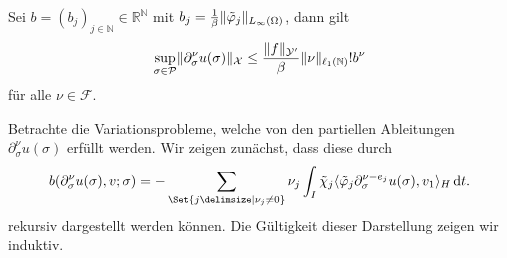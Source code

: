 \begin{Satz}
\label{satz:mhoo}
    Sei $b = (b_j)_{j \in \mathbb{N}} \in \mathbb{R}^{\mathbb{N}}$ mit $b_{j} = \frac{1}{\beta} \lVert\tilde{\varphi}_{j}\rVert_{L_{\infty}(\Omega)}$, dann gilt
    \begin{equation}
        \sup_{\sigma \in \mathcal P} \lVert\partial^{\nu}_{\sigma} u(\sigma)\rVert_{\mathcal X} \leq \frac{\lVert f\rVert_{\mathcal Y'}}{\beta} \lVert\nu\rVert_{\ell_{1}(\mathbb{N})}! b^{\nu}
    \end{equation}
    für alle $\nu \in \mathcal F$.

    \begin{Beweis}
        Betrachte die Variationsprobleme, welche von den partiellen Ableitungen $\partial^{\nu}_{\sigma} u(\sigma)$ erfüllt werden.
        Wir zeigen zunächst, dass diese durch
        \begin{equation}
        \label{eq:ps:rg:partielle_ableitungen_rekursive_ableitungen}
            b(\partial^{\nu}_{\sigma} u(\sigma), v; \sigma)
            = - \sum_{\Set{j \given \nu_{j} \neq 0}} \nu_{j} \int_{I} \tilde{\chi}_{j} \skp{\tilde{\varphi}_{j} \partial^{\nu - e_{j}}_{\sigma} u(\sigma)}{v_{1}}{H} \diff t.
        \end{equation}
        rekursiv dargestellt werden können.
        Die Gültigkeit dieser Darstellung zeigen wir induktiv.


\end{Beweis}
\end{Satz}
